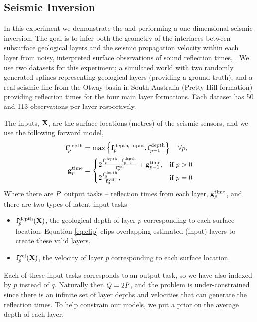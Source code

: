 \subsection{Seismic Inversion}

In this experiment we demonstrate the \eks and \uks performing a
one-dimensional seismic inversion. The goal is to infer both the geometry of
the interfaces between subsurface geological layers and the seismic propagation velocity
within each layer from noisy, interpreted surface observations of sound
reflection times, \Outs. We use two datasets for this experiment; a simulated
world with two randomly generated splines representing geological layers (providing a ground-truth), 
and a real seismic line from the Otway basin in South Australia (Pretty Hill
formation) providing reflection times for the four main layer formations.
Each dataset has 50 and 113 observations per layer respectively.

The inputs, $\mathbf{X}$, are the surface locations (metres) of the seismic sensors,
and we use the following forward model,
\begin{align}
    \mathbf{f}_p^\text{depth} &= \max\left\{{\mathbf{f}_p^\text{depth, input},
        \mathbf{f}_{p-1}^\text{depth}}\right\} \quad \forall p, \label{eq:clip} \\
    \mathbf{g}_p^\text{time} &=
    \begin{cases}
        2\frac{\mathbf{f}_p^\text{depth} - \mathbf{f}_{p-1}^\text{depth}}
        {\mathbf{f}_p^\text{vel}} + \mathbf{g}_{p-1}^\text{time},
        & \text{if } p > 0 \\
        2\frac{\mathbf{f}_0^\text{depth}}{\mathbf{f}_0^\text{vel}},
        & \text{if } p = 0
    \end{cases}
\end{align}
Where there are $P$ output tasks -- reflection times from each layer,
$\mathbf{g}_p^\text{time}$, and there are two types of latent input tasks;
\begin{itemize}
    \item $\mathbf{f}_p^\text{depth}\!\left({\mathbf{X}}\right)$, the geological depth of layer
        $p$ corresponding to each surface location. Equation \eqref{eq:clip} 
        clips overlapping estimated (input) layers to create these valid
        layers.
    \item $\mathbf{f}_p^\text{vel}\!\left({\mathbf{X}}\right)$, the velocity of layer $p$ 
        corresponding to each surface location.
\end{itemize}

Each of these input tasks corresponds to an output task, so we have also
indexed by $p$ instead of $q$. Naturally then $Q = 2P$, and the
problem is under-constrained since there is an infinite set of layer depths and
velocities that can generate the reflection times. To help constrain our
models, we put a prior on the average depth of each layer.

